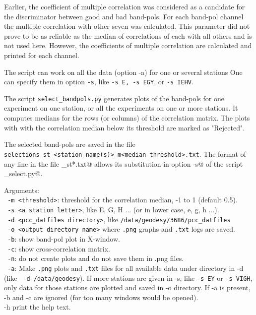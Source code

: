 \documentclass[preprint]{aastex}
\begin{document}
Earlier, the coefficient of multiple correlation was considered as a candidate for the discriminator between good and bad band-pols. For each band-pol channel the multiple correlation with other seven was calculated. This parameter did not prove to be as reliable as the median of correlations of each with all others and is not used here. However, the coefficients of multiple correlation are calculated and printed for each channel.

The script can work on all the data (option -a) for one or several stations One can specify them in option \texttt{-s}, like \texttt{-s E, -s EGY}, or \texttt{-s IEHV}.

The script \texttt{select\_bandpols.py} generates plots of the band-pols for one experiment on one station, or all the experiments on one or more stations. It computes medians for the rows (or columns) of the correlation matrix. The plots with with the correlation median below its threshold are marked as "Rejected". 

The selected band-pols are saved in the file \\
\verb$selections_st_<station-name(s)>_m<median-threshold>.txt$. 
The format of any line in the file \verb@selections_st*.txt@ allows its substitution in option \verb@-s@ of the script \verb@pcc_select.py@.


Arguments: \\
\texttt{  -m <threshold>}:    threshold for the correlation median, -1 to 1 (default 0.5). \\
\texttt{  -s <a station letter>}, like E, G, H ... (or in lower case, e, g, h ...). \\
\texttt{  -d <pcc\_datfiles directory>}, like \texttt{/data/geodesy/3686/pcc\_datfiles} \\
\texttt{  -o <output directory name>} where \texttt{.png} graphs and \texttt{.txt} logs are saved. \\
\texttt{  -b}: show band-pol plot in X-window. \\
\texttt{  -c}: show cross-correlation matrix. \\
\texttt{  -n}: do not create plots and do not save them in .png files. \\
\texttt{  -a}: Make \texttt{.png} plots and \texttt{.txt} files for all available data under directory in -d (like \texttt{  -d /data/geodesy}). If more stations are given in -s, like \texttt{-s EY} or \texttt{-s VIGH}, only data for those stations are plotted and saved in -o directory. If -a is present, -b and -c are ignored (for too many windows would be opened). \\
  -h print the help text. \\
\end{document}
